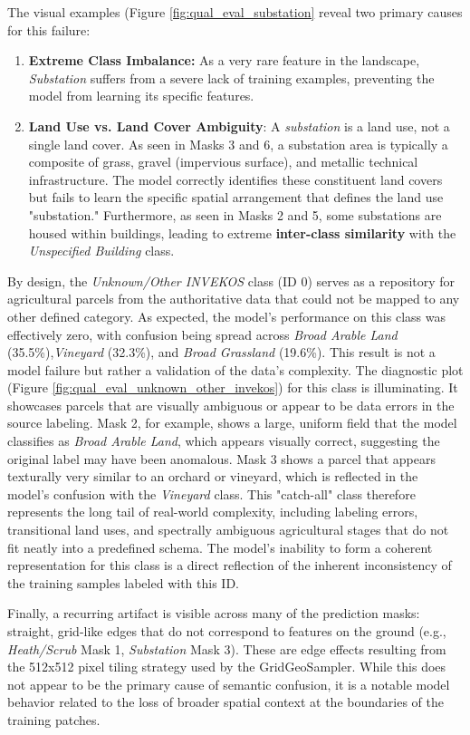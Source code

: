 \documentclass{report}
\begin{document}
The visual examples (Figure \ref{fig:qual_eval_substation} reveal two primary causes for this failure:
\begin{enumerate}

    \item\textbf{Extreme Class Imbalance:} As a very rare feature in the landscape, \textit{Substation} suffers from a severe lack of training examples, preventing the model from learning its specific features.
    \item\textbf{Land Use vs. Land Cover Ambiguity}: A \textit{substation} is a land use, not a single land cover. As seen in Masks 3 and 6, a substation area is typically a composite of grass, gravel (impervious surface), and metallic technical infrastructure. The model correctly identifies these constituent land covers but fails to learn the specific spatial arrangement that defines the land use "substation." Furthermore, as seen in Masks 2 and 5, some substations are housed within buildings, leading to extreme \textbf{inter-class similarity} with the \textit{Unspecified Building} class.
\end{enumerate}
\par
By design, the \textit{Unknown/Other INVEKOS} class (ID 0) serves as a repository for agricultural parcels from the authoritative data that could not be mapped to any other defined category. As expected, the model's performance on this class was effectively zero, with confusion being spread across \textit{Broad Arable Land} (35.5\%),\textit{Vineyard} (32.3\%), and \textit{Broad Grassland} (19.6\%). 
This result is not a model failure but rather a validation of the data's complexity. The diagnostic plot (Figure \ref{fig:qual_eval_unknown_other_invekos}) for this class is illuminating. It showcases parcels that are visually ambiguous or appear to be data errors in the source labeling. Mask 2, for example, shows a large, uniform field that the model classifies as \textit{Broad Arable Land}, which appears visually correct, suggesting the original label may have been anomalous. Mask 3 shows a parcel that appears texturally very similar to an orchard or vineyard, which is reflected in the model's confusion with the \textit{Vineyard} class. This "catch-all" class therefore represents the long tail of real-world complexity, including labeling errors, transitional land uses, and spectrally ambiguous agricultural stages that do not fit neatly into a predefined schema. The model's inability to form a coherent representation for this class is a direct reflection of the inherent inconsistency of the training samples labeled with this ID. \par
Finally, a recurring artifact is visible across many of the prediction masks: straight, grid-like edges that do not correspond to features on the ground (e.g., \textit{Heath/Scrub} Mask 1, \textit{Substation} Mask 3). These are edge effects resulting from the 512x512 pixel tiling strategy used by the GridGeoSampler. While this does not appear to be the primary cause of semantic confusion, it is a notable model behavior related to the loss of broader spatial context at the boundaries of the training patches.
\end{document}
